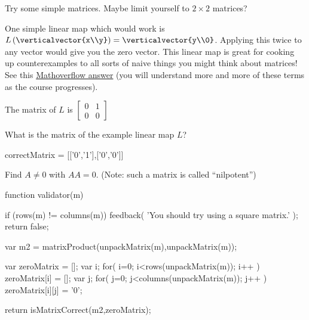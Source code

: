 \documentclass{ximera}
\begin{document}
\begin{question}
  \begin{solution}
	\begin{hint}
		Try some simple matrices.  Maybe limit yourself to $2\times2$ matrices?
	\end{hint}
	\begin{hint}
		One simple linear map which would work is $L\left(\verticalvector{x\\y}\right) = \verticalvector{y\\0}$.  Applying this twice to any vector would 
		give you the zero vector.   This linear map is great for cooking up counterexamples to all sorts of naive things you might think about matrices!  See 
		this \href{http://mathoverflow.net/questions/16829/what-are-your-favorite-instructional-counterexamples/16841#16841}{Mathoverflow  answer} (you will understand
		more and more of these terms as the course progresses).
		
		\begin{question}
			\begin{hint}
				The matrix of $L$ is $\begin{bmatrix} 0&1\\0&0 \end{bmatrix}$
			\end{hint}
			What is the matrix of the example linear map $L$?
			\begin{matrix-answer}[name=A]
				correctMatrix = [['0','1'],['0','0']]
			\end{matrix-answer}
		\end{question}
	\end{hint}
	
    Find $A \neq 0$ with $AA = 0$.  (Note:  such a matrix is called ``nilpotent'')

    \begin{matrix-answer}[name=A]
    function validator(m) {
      if (rows(m) != columns(m)) {
        feedback( 'You should try using a square matrix.' );
        return false;
      }
      
      var m2 = matrixProduct(unpackMatrix(m),unpackMatrix(m));
      
      var zeroMatrix = [];
      var i;
      for( i=0; i<rows(unpackMatrix(m)); i++ ) {
        zeroMatrix[i] = [];
        var j;
        for( j=0; j<columns(unpackMatrix(m)); j++ ) {
          zeroMatrix[i][j] = '0';
        }
      }

      return isMatrixCorrect(m2,zeroMatrix);
    }
    \end{matrix-answer}
  \end{solution}
\end{question}
	
\end{document}
